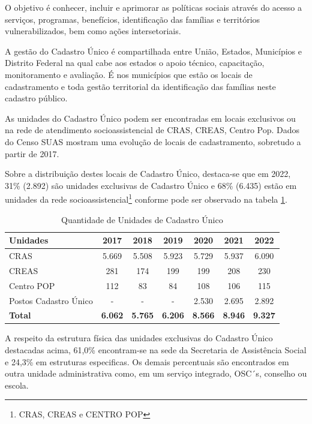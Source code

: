 \documentclass[
  brazilian]{report}
\begin{document}
O objetivo é conhecer, incluir e aprimorar as políticas sociais através
do acesso a serviços, programas, benefícios, identificação das famílias
e territórios vulnerabilizados, bem como ações intersetoriais.

A gestão do Cadastro Único é compartilhada entre União, Estados,
Municípios e Distrito Federal na qual cabe aos estados o apoio técnico,
capacitação, monitoramento e avaliação. É nos municípios que estão os
locais de cadastramento e toda gestão territorial da identificação das
famílias neste cadastro público.

As unidades do Cadastro Único podem ser encontradas em locais exclusivos
ou na rede de atendimento socioassistencial de CRAS, CREAS, Centro Pop.
Dados do Censo SUAS mostram uma evolução de locais de cadastramento,
sobretudo a partir de 2017.

Sobre a distribuição destes locais de Cadastro Único, destaca-se que em
2022, 31\% (2.892) são unidades exclusivas de Cadastro Único e 68\%
(6.435) estão em unidades da rede
socioassistencial\footnote{CRAS, CREAS e CENTRO POP} conforme pode ser
observado na tabela \ref{tab:qtd_unidades}.

\begin{table}[H]
\centering
\caption{Quantidade de Unidades de Cadastro Único}
\label{tab:qtd_unidades}
\begin{tabular}{@{}lcccccc@{}}
\toprule
Unidades             & 2017  & 2018 & 2019 & 2020 &  2021 & 2022            \\ \midrule
CRAS                    & 5.669 & 5.508 & 5.923 & 5.729 & 5.937 & 6.090         \\
CREAS                   & 281 & 174 & 199 & 199 & 208 & 230                     \\
Centro POP              & 112 & 83 & 84 & 108 & 106 & 115                       \\
Postos Cadastro Único   & - & - & - & 2.530 & 2.695 & 2.892                       \\ \bottomrule
\textbf{Total}                   &\textbf{6.062} & \textbf{5.765} & \textbf{6.206} & \textbf{8.566} & \textbf{8.946} & \textbf{9.327}          \\ \bottomrule
\end{tabular}
\end{table}

A respeito da estrutura física das unidades exclusivas do Cadastro Único
destacadas acima, 61,0\% encontram-se na sede da Secretaria de
Assistência Social e 24,3\% em estruturas especificas. Os demais
percentuais são encontrados em outra unidade administrativa como, em um
serviço integrado, OSC´s, conselho ou escola.
\end{document}

